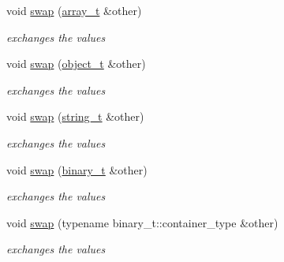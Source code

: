 \begin{DoxyCompactItemize}
void \hyperlink{classnlohmann_1_1basic__json_a76126242de262f6d38cadda19e0d13e1}{swap} (\hyperlink{classnlohmann_1_1basic__json_a858c1cf8407bc06494e3a1114a3b73e7}{array\+\_\+t} \&other)
\begin{DoxyCompactList}\small\item\em exchanges the values \end{DoxyCompactList}\item 
void \hyperlink{classnlohmann_1_1basic__json_a57b86bdcfc55557dacc36969adb0417e}{swap} (\hyperlink{classnlohmann_1_1basic__json_aef3ff5a73597850597d1d40db9edd376}{object\+\_\+t} \&other)
\begin{DoxyCompactList}\small\item\em exchanges the values \end{DoxyCompactList}\item 
void \hyperlink{classnlohmann_1_1basic__json_aac916df9561daf4eaf2372119fe91899}{swap} (\hyperlink{classnlohmann_1_1basic__json_a33593865ffb1860323dcbd52425b90c8}{string\+\_\+t} \&other)
\begin{DoxyCompactList}\small\item\em exchanges the values \end{DoxyCompactList}\item 
void \hyperlink{classnlohmann_1_1basic__json_aa242e339ebc7583e114f2167a83f8c90}{swap} (\hyperlink{classnlohmann_1_1basic__json_ad6c955145bebde84d93991ffed7cd389}{binary\+\_\+t} \&other)
\begin{DoxyCompactList}\small\item\em exchanges the values \end{DoxyCompactList}\item 
void \hyperlink{classnlohmann_1_1basic__json_a749a1f5091a5e63ccfe919e0aef986af}{swap} (typename binary\+\_\+t\+::container\+\_\+type \&other)
\begin{DoxyCompactList}\small\item\em exchanges the values \end{DoxyCompactList}\end{DoxyCompactItemize}

